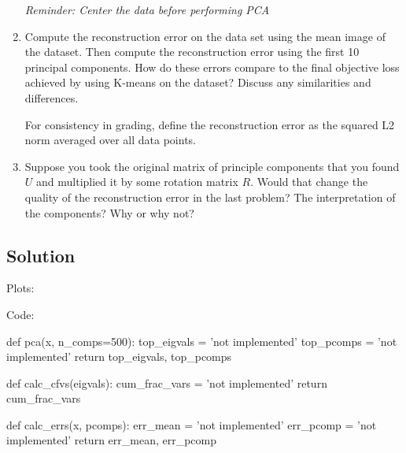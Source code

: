 \documentclass[submit]{harvardml}
\begin{document}
\begin{problem}
\begin{enumerate}
  \textit{Reminder: Center the data before performing PCA}

\item Compute the reconstruction error on the data set using the mean
  image of the dataset.  Then compute the reconstruction error using
  the first 10 principal components.  How do these errors compare to
  the final objective loss achieved by using K-means on the dataset?
  Discuss any similarities and differences.

  For consistency in grading, define the reconstruction error as the squared L2
  norm averaged over all data points.

\item Suppose you took the original matrix of principle components
  that you found $U$ and multiplied it by some rotation matrix $R$.
  Would that change the quality of the reconstruction error in the
  last problem?  The interpretation of the components?  Why or why
  not?
  
\end{enumerate}


\end{problem}

\newpage
\subsection*{Solution}
Plots:



Code:

\begin{python}
def pca(x, n_comps=500):
    top_eigvals = 'not implemented'
    top_pcomps = 'not implemented'
    return top_eigvals, top_pcomps


def calc_cfvs(eigvals):
    cum_frac_vars = 'not implemented'
    return cum_frac_vars


def calc_errs(x, pcomps):
    err_mean = 'not implemented'
    err_pcomp = 'not implemented'
    return err_mean, err_pcomp
\end{python}
\end{document}
